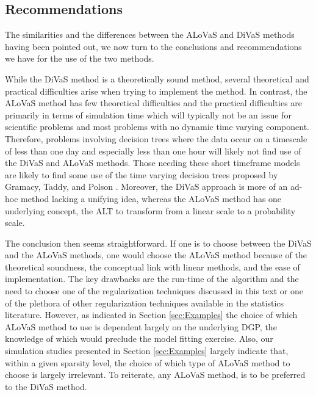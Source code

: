 \subsection{Recommendations}

The similarities and the differences between the ALoVaS and DiVaS methods having been pointed out, we now turn to the conclusions and recommendations we have for the use of the two methods. 

While the DiVaS method is a theoretically sound method, several theoretical and practical difficulties arise when trying to implement the method. In contrast, the ALoVaS method has few theoretical difficulties and the practical difficulties are primarily in terms of simulation time which will typically not be an issue for scientific problems and most problems with no dynamic time varying component. Therefore, problems involving decision trees where the data occur on a timescale of less than one day and especially less than one hour will likely not find use of the DiVaS and ALoVaS methods. Those needing these short timeframe models are likely to find some use of the time varying decision trees proposed by Gramacy, Taddy, and Polson \cite{taddy2011dynamic}. Moreover, the DiVaS approach is more of an ad-hoc method lacking a unifying idea, whereas the ALoVaS method has one underlying concept, the ALT to transform from a linear scale to a probability scale. 

The conclusion then seems straightforward. If one is to choose between the DiVaS and the ALoVaS methods, one would choose the ALoVaS method because of the  theoretical soundness, the conceptual link with linear methods, and the ease of implementation. The key drawbacks are the run-time of the algorithm and the need to choose one of the regularization techniques discussed in this text or one of the plethora of other regularization techniques available in the statistics literature. However, as indicated in Section \ref{sec:Examples}  the choice of which ALoVaS method to use is dependent largely on the underlying DGP, the knowledge of which would preclude the model fitting exercise. Also, our simulation studies presented in Section \ref{sec:Examples} largely indicate that, within a given sparsity level, the choice of which type of ALoVaS method to choose is largely irrelevant. To reiterate, any ALoVaS method, is to be preferred to the DiVaS method. 

